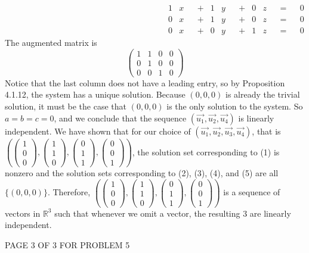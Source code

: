 \documentclass[12pt]{article}
\newenvironment{problem}[2][Problem]
{
	\begin{trivlist} 
		\item[\hskip \labelsep {\bfseries #1 #2:}]
	}
{
	\end{trivlist}
	}
\begin{document}
\begin{problem}{6}
\begin{align*}
&&&&&&&& &&&&&&&& &&&&&&&& 1&x& &+& 1&y& &+& 0&z& &=& &0& &&&&&&&& &&&&&&&& &&&&&&&&\\
&&&&&&&& &&&&&&&& &&&&&&&& 0&x& &+& 1&y& &+& 0&z& &=& &0& &&&&&&&& &&&&&&&& &&&&&&&&\\
&&&&&&&& &&&&&&&& &&&&&&&& 0&x& &+& 0&y& &+& 1&z& &=& &0& &&&&&&&& &&&&&&&& &&&&&&&&
\end{align*}
The augmented matrix is
\[
\begin{pmatrix}1&1&0&0\\0&1&0&0\\0&0&1&0\end{pmatrix}
\]
Notice that the last column does not have a leading entry, so by Proposition 4.1.12, the system has a unique solution. Because $(0,0,0)$ is already the trivial solution, it must be the case that $(0,0,0)$ is the only solution to the system. So $a=b=c=0$, and we conclude that the sequence $(\vec{u_1},\vec{u_2},\vec{u_4})$ is linearly independent.
\newline
\newline
\noindent
We have shown that for our choice of $(\vec{u_1},\vec{u_2},\vec{u_3},\vec{u_4})$, that is $\left(\begin{pmatrix}1\\0\\0\end{pmatrix},  \begin{pmatrix} 1\\1\\0\end{pmatrix},  \begin{pmatrix}0\\1\\1\end{pmatrix},  \begin{pmatrix}0\\0\\1\end{pmatrix}\right)$, the solution set corresponding to (1) is nonzero and the solution sets corresponding to (2), (3), (4), and (5) are all $\{(0,0,0)\}$. Therefore, $\left(\begin{pmatrix}1\\0\\0\end{pmatrix},  \begin{pmatrix} 1\\1\\0\end{pmatrix},  \begin{pmatrix}0\\1\\1\end{pmatrix},  \begin{pmatrix}0\\0\\1\end{pmatrix}\right)$ is a sequence of vectors in $\mathbb{R}^3$ such that whenever we omit a vector, the resulting 3 are linearly independent.
\vfill
\centerline{PAGE 3 OF 3 FOR PROBLEM 5}
\end{problem}
\end{document}
